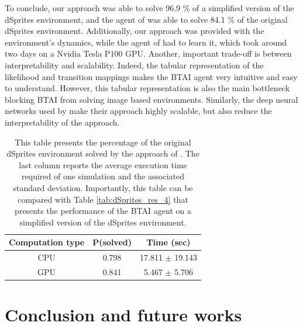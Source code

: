 \documentclass[twoside,11pt]{article}
\begin{document}
To conclude, our approach was able to solve 96.9 \% of a simplified version of the dSprites environment, and the agent of \citet{DeepAIwithMCMC} was able to solve 84.1 \% of the original dSprites environment. Additionally, our approach was provided with the environment's dynamics, while the agent of \citet{DeepAIwithMCMC} had to learn it, which took around two days on a Nvidia Tesla P100 GPU. Another, important trade-off is between interpretability and scalability. Indeed, the tabular representation of the likelihood and transition mappings makes the BTAI agent very intuitive and easy to understand. However, this tabular representation is also the main bottleneck blocking BTAI from solving image based environments. Similarly, the deep neural networks used by \citet{DeepAIwithMCMC} make their approach highly scalable, but also reduce the interpretability of the approach.

\begin{table}[H]
\centering
\begin{tabular}{ |c|c|c| }
 \hline
 Computation type & P(solved) & Time (sec) \\
 \hline
 CPU & 0.798 & 17.811 $\pm$ 19.143\\
 GPU & 0.841 & 5.467 $\pm$ 5.706\\
 \hline
\end{tabular}
\caption{This table presents the percentage of the original dSprites environment solved by the approach of \citet{DeepAIwithMCMC}. The last column reports the average execution time required of one simulation and the associated standard deviation. Importantly, this table can be compared with Table \ref{tab:dSprites_res_4} that presents the performance of the BTAI agent on a simplified version of the dSprites environment.}
\label{tab:dSprites_fountas}
\end{table}

\section{Conclusion and future works} \label{sec:conclusion}
\end{document}
